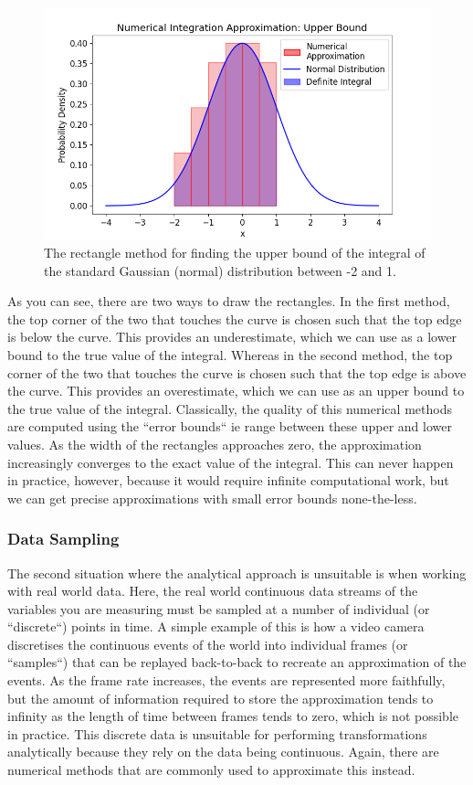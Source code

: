 \documentclass[12pt]{article}
\newcommand{\ndiFigCaption}[1]{The rectangle method for finding the #1 bound of the integral of the standard Gaussian (normal) distribution between -2 and 1.}
\begin{document}
    \FloatBarrier

    \begin{figure}[htbp]
        \centering
        \includegraphics[width=0.8\linewidth]{figures/ndi-num2/ndi-num2_}
        \caption{\ndiFigCaption{upper}}
        \label{fig:ndi-num2_}
    \end{figure}

    As you can see, there are two ways to draw the rectangles.
    In the first method, the top corner of the two that touches the curve is chosen such that the top edge is below the curve.
    This provides an underestimate, which we can use as a lower bound to the true value of the integral.
    Whereas in the second method, the top corner of the two that touches the curve is chosen such that the top edge is above the curve.
    This provides an overestimate, which we can use as an upper bound to the true value of the integral.
    Classically, the quality of this numerical methods are computed using the ``error bounds`` ie range between these upper and lower values.
    As the width of the rectangles approaches zero, the approximation increasingly converges to the exact value of the integral.
    This can never happen in practice, however, because it would require infinite computational work, but we can get precise approximations with small error bounds none-the-less.

    \subsubsection{Data Sampling}
    The second situation where the analytical approach is unsuitable is when working with real world data.
    Here, the real world continuous data streams of the variables you are measuring must be sampled at a number of individual (or ``discrete``) points in time.
    A simple example of this is how a video camera discretises the continuous events of the world into individual frames (or ``samples``) that can be replayed back-to-back to recreate an approximation of the events.
    As the frame rate increases, the events are represented more faithfully, but the amount of information required to store the approximation tends to infinity as the length of time between frames tends to zero, which is not possible in practice.
    This discrete data is unsuitable for performing transformations analytically because they rely on the data being continuous.
    Again, there are numerical methods that are commonly used to approximate this instead.
\end{document}

